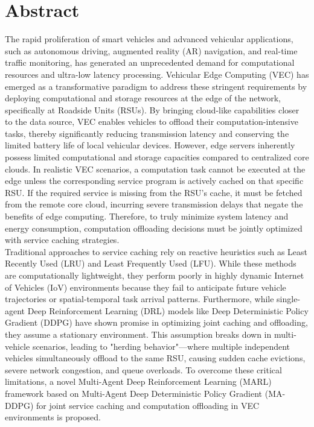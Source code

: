 \documentclass[12pt,a4paper]{report}
\begin{document}
\chapter*{Abstract}

The rapid proliferation of smart vehicles and advanced vehicular applications, such as autonomous driving, augmented reality (AR) navigation, and real-time traffic monitoring, has generated an unprecedented demand for computational resources and ultra-low latency processing. Vehicular Edge Computing (VEC) has emerged as a transformative paradigm to address these stringent requirements by deploying computational and storage resources at the edge of the network, specifically at Roadside Units (RSUs). By bringing cloud-like capabilities closer to the data source, VEC enables vehicles to offload their computation-intensive tasks, thereby significantly reducing transmission latency and conserving the limited battery life of local vehicular devices. However, edge servers inherently possess limited computational and storage capacities compared to centralized core clouds. In realistic VEC scenarios, a computation task cannot be executed at the edge unless the corresponding service program is actively cached on that specific RSU. If the required service is missing from the RSU's cache, it must be fetched from the remote core cloud, incurring severe transmission delays that negate the benefits of edge computing. Therefore, to truly minimize system latency and energy consumption, computation offloading decisions must be jointly optimized with service caching strategies.\\

Traditional approaches to service caching rely on reactive heuristics such as Least Recently Used (LRU) and Least Frequently Used (LFU). While these methods are computationally lightweight, they perform poorly in highly dynamic Internet of Vehicles (IoV) environments because they fail to anticipate future vehicle trajectories or spatial-temporal task arrival patterns. Furthermore, while single-agent Deep Reinforcement Learning (DRL) models like Deep Deterministic Policy Gradient (DDPG) have shown promise in optimizing joint caching and offloading, they assume a stationary environment. This assumption breaks down in multi-vehicle scenarios, leading to "herding behavior"—where multiple independent vehicles simultaneously offload to the same RSU, causing sudden cache evictions, severe network congestion, and queue overloads. To overcome these critical limitations, a novel Multi-Agent Deep Reinforcement Learning (MARL) framework based on Multi-Agent Deep Deterministic Policy Gradient (MA-DDPG) for joint service caching and computation offloading in VEC environments is proposed.\\
\end{document}
